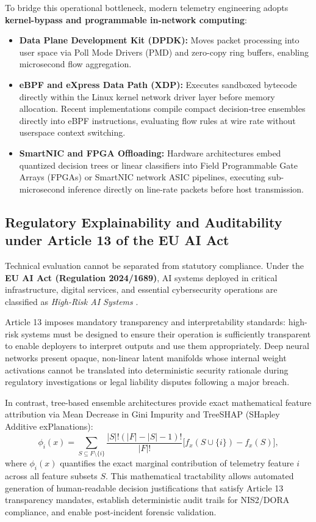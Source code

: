 \documentclass[conference,10pt,twocolumn,a4paper]{IEEEtran}
\begin{document}
To bridge this operational bottleneck, modern telemetry engineering adopts \textbf{kernel-bypass and programmable in-network computing}:
\begin{itemize}
    \item \textbf{Data Plane Development Kit (DPDK):} Moves packet processing into user space via Poll Mode Drivers (PMD) and zero-copy ring buffers, enabling microsecond flow aggregation.
    \item \textbf{eBPF and eXpress Data Path (XDP):} Executes sandboxed bytecode directly within the Linux kernel network driver layer before memory allocation. Recent implementations compile compact decision-tree ensembles directly into eBPF instructions, evaluating flow rules at wire rate without userspace context switching.
    \item \textbf{SmartNIC and FPGA Offloading:} Hardware architectures embed quantized decision trees or linear classifiers into Field Programmable Gate Arrays (FPGAs) or SmartNIC network ASIC pipelines, executing sub-microsecond inference directly on line-rate packets before host transmission.
\end{itemize}

\subsection{Regulatory Explainability and Auditability under Article 13 of the EU AI Act}
Technical evaluation cannot be separated from statutory compliance. Under the \textbf{EU AI Act (Regulation 2024/1689)}, AI systems deployed in critical infrastructure, digital services, and essential cybersecurity operations are classified as \emph{High-Risk AI Systems} \cite{eu_ai_act_2024}.

Article 13 imposes mandatory transparency and interpretability standards: high-risk systems must be designed to ensure their operation is sufficiently transparent to enable deployers to interpret outputs and use them appropriately. Deep neural networks present opaque, non-linear latent manifolds whose internal weight activations cannot be translated into deterministic security rationale during regulatory investigations or legal liability disputes following a major breach.

In contrast, tree-based ensemble architectures provide exact mathematical feature attribution via Mean Decrease in Gini Impurity and TreeSHAP (SHapley Additive exPlanations):
\begin{equation}
\phi_i(x) = \sum_{S \subseteq F \setminus \{i\}} \frac{|S|! (|F| - |S| - 1)!}{|F|!} \Big[ f_x(S \cup \{i\}) - f_x(S) \Big],
\end{equation}
where $\phi_i(x)$ quantifies the exact marginal contribution of telemetry feature $i$ across all feature subsets $S$. This mathematical tractability allows automated generation of human-readable decision justifications that satisfy Article 13 transparency mandates, establish deterministic audit trails for NIS2/DORA compliance, and enable post-incident forensic validation.
\end{document}
